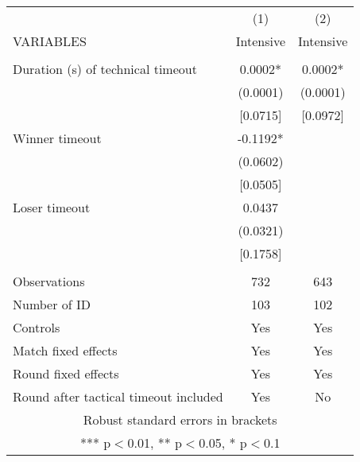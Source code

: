 \documentclass[]{article}
\begin{document}
\begin{tabular}{lcc} \hline
 & (1) & (2) \\
VARIABLES & Intensive & Intensive \\ \hline
 &  &  \\
Duration (s) of technical timeout & 0.0002* & 0.0002* \\
 & (0.0001) & (0.0001) \\
 & [0.0715] & [0.0972] \\
Winner timeout & -0.1192* &  \\
 & (0.0602) &  \\
 & [0.0505] &  \\
Loser timeout & 0.0437 &  \\
 & (0.0321) &  \\
 & [0.1758] &  \\
 &  &  \\
Observations & 732 & 643 \\
Number of ID & 103 & 102 \\
Controls & Yes & Yes \\
Match fixed effects & Yes & Yes \\
Round fixed effects & Yes & Yes \\
 Round after tactical timeout included & Yes & No \\ \hline
\multicolumn{3}{c}{ Robust standard errors in brackets} \\
\multicolumn{3}{c}{ *** p$<$0.01, ** p$<$0.05, * p$<$0.1} \\
\end{tabular}
\end{document}
